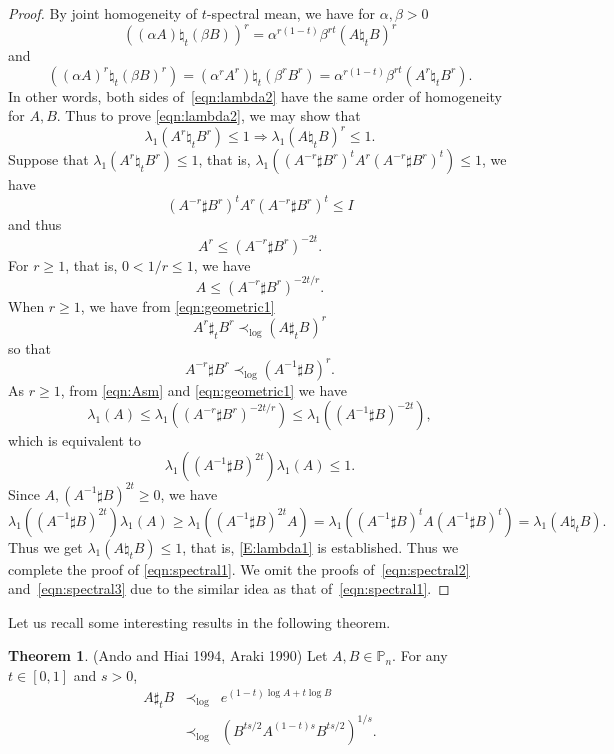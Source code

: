 \documentclass[12pt, reqno]{amsart}
\numberwithin{equation}{section}
\theoremstyle{definition}
\newtheorem{theorem}{Theorem}[section]
\renewcommand{\ge}{\geqslant}
\renewcommand{\le}{\leqslant}
\def\P{\mathbb P}
\begin{document}
\begin{proof}
By joint homogeneity of $t$-spectral mean, we have for $\alpha, \beta >0$
\begin{equation}
((\alpha A)\natural_t (\beta B))^r = \alpha^{r(1-t)}\beta^{rt}(A\natural_t  B)^r
\end{equation}
and
\begin{equation}
 ((\alpha A)^r\natural_t (\beta B)^r) = (\alpha^r A^r)\natural_t (\beta^r B^r) = \alpha^{r(1-t)} \beta^{rt} (A^r\natural_t B^r).
\end{equation}
In other words, both sides of~\eqref{eqn:lambda2} have the same order of homogeneity for $A, B$.
Thus to prove \eqref{eqn:lambda2}, we may show that 
\begin{equation}\label{E:lambda1}
\lambda_1(A^r\natural_t B^r)\le 1 \Rightarrow \lambda_1(A\natural_t B)^r \le 1.
\end{equation}
Suppose that  $\lambda_1(A^r\natural_t B^r)\le 1$, that is, $\lambda_1((A^{-r}\sharp B^r)^t A^r (A^{-r}\sharp B^r)^t)\le 1$, we have 
\[
(A^{-r}\sharp B^r)^t A^r (A^{-r}\sharp B^r)^t\le I
\]
and thus
\[
A^r \le (A^{-r}\sharp B^r)^{-2t}.
\]
For $r\ge 1$, that is, $0< 1/r\le 1$, we have
\begin{equation}\label{eqn:Asm}
A \le (A^{-r}\sharp B^r)^{-2t/r}.
\end{equation}
When $r\ge 1$, we have from \eqref{eqn:geometric1} 
\[
A^r \sharp_t B^r \prec_{\log} (A\sharp_t B)^r
\]
so that
\[
A^{-r} \sharp B^r \prec_{\log} (A^{-1}\sharp B)^r.
\]
As $r\ge 1$, from \eqref{eqn:Asm} and \eqref{eqn:geometric1} we have
\[
\lambda_1(A)\le \lambda_1 ((A^{-r} \sharp B^r)^{-2t/r})\le \lambda_1((A^{-1} \sharp B)^{-2t}),\]
which is equivalent to
\[
\lambda_1((A^{-1} \sharp B)^{2t})\lambda_1(A)\le 1.
\]
Since $A, (A^{-1} \sharp B)^{2t} \ge 0$, we have
\[
\lambda_1((A^{-1} \sharp B)^{2t})\lambda_1(A)
\ge \lambda_1((A^{-1} \sharp B)^{2t}A) 
= \lambda_1((A^{-1} \sharp B)^{t}A(A^{-1} \sharp B)^{t})
= \lambda_1(A\natural_t B).
\]
Thus we get $\lambda_1(A\natural_t B) \le 1$, that is, \eqref{E:lambda1} is established. Thus we complete the proof of \eqref{eqn:spectral1}. 
We omit the proofs of~\eqref{eqn:spectral2} and~\eqref{eqn:spectral3} due to the similar idea as that of~\eqref{eqn:spectral1}.
\end{proof}

Let us recall some interesting results in the following theorem. 
\begin{theorem} \label{Thm:AHA} \rm (Ando and Hiai 1994, Araki 1990)
Let $A, B \in \P_n$.
For any  $t \in [0, 1]$ and $s > 0$,
\begin{eqnarray}
A\sharp_{t}B &\prec_{\log} &e^{(1-t) \log A + t \log B} \label{E:Ando-Hiai}   \\
 &\prec_{\log}&\left(B^{ts/2}A^{(1-t)s}B^{ts/2} \right)^{1/s}.  \label{E:Araki}
\end{eqnarray}
\end{theorem}
\end{document}
